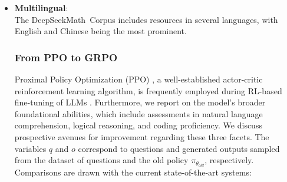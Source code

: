 \begin{itemize}[topsep=0pt]
\begin{itemize}[topsep=0pt]
\begin{itemize}[topsep=0pt]
\begin{equation}
    r_{t} = r_\varphi(q, o_{\le t}) - \beta \log\frac{\pi_{\theta}(o_{t}|q, o_{<t})}{\pi_{ref}(o_{t}|q, o_{<t})},
\label{eq:PPO-reward}
\end{equation}

In this formulation, $r_\varphi$ denotes the reward model, and $\pi_{ref}$ refers to the reference model, often initialized as the SFT model; $\beta$ serves as the weighting coefficient for the KL penalty. The policy model is then improved by maximizing

\subsubsection{Iterative RL with GRPO} During the progression of the reinforcement learning process, the initial reward model may become inadequate for providing effective supervision over the evolving policy model. \item \textbf{Multilingual}:\\
    The DeepSeekMath~Corpus includes resources in several languages, with English and Chinese being the most prominent. \subsubsection{From PPO to GRPO} Proximal Policy Optimization (PPO) \citep{schulman2017proximal}, a well-established actor-critic reinforcement learning algorithm, is frequently employed during RL-based fine-tuning of LLMs \citep{ouyang2022training}. Furthermore, we report on the model's broader foundational abilities, which include assessments in natural language comprehension, logical reasoning, and coding proficiency. We discuss prospective avenues for improvement regarding these three facets. The variables $q$ and $o$ correspond to questions and generated outputs sampled from the dataset of questions and the old policy $\pi_{\theta_{old}}$, respectively. Comparisons are drawn with the current state-of-the-art systems:


\end{itemize}
\end{itemize}
\end{itemize}
